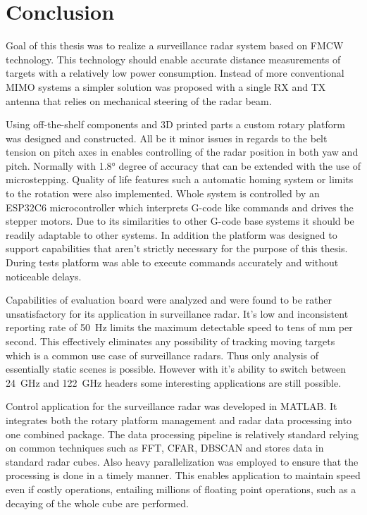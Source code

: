 \chapter*{Conclusion}

Goal of this thesis was to realize a surveillance radar system based on FMCW technology.
This technology should enable accurate distance measurements of targets with a relatively low power consumption.
Instead of more conventional MIMO systems a simpler solution was proposed with a single RX and TX antenna that relies on mechanical steering of the radar beam.

Using off-the-shelf components and 3D printed parts a custom rotary platform was designed and constructed.
All be it minor issues in regards to the belt tension on pitch axes in enables controlling of the radar position in both yaw and pitch.
Normally with 1.8° degree of accuracy that can be extended with the use of microstepping.
Quality of life features such a automatic homing system or limits to the rotation were also implemented.
Whole system is controlled by an ESP32C6 microcontroller which interprets G-code like commands and drives the stepper motors.
Due to its similarities to other G-code base systems it should be readily adaptable to other systems.
In addition the platform was designed to support capabilities that aren't strictly necessary for the purpose of this thesis.
During tests platform was able to execute commands accurately and without noticeable delays.

Capabilities of \sidar evaluation board were analyzed and were found to be rather unsatisfactory for its application in surveillance radar.
It's low and inconsistent reporting rate of 50~Hz limits the maximum detectable speed to tens of mm per second.
This effectively eliminates any possibility of tracking moving targets which is a common use case of surveillance radars.
Thus only analysis of essentially static scenes is possible.
However with it's ability to switch between 24~GHz and 122~GHz headers some interesting applications are still possible.

Control application for the surveillance radar was developed in MATLAB.
It integrates both the rotary platform management and radar data processing into one combined package.
The data processing pipeline is relatively standard relying on common techniques such as FFT, CFAR, DBSCAN and stores data in standard radar cubes.
Also heavy parallelization was employed to ensure that the processing is done in a timely manner.
This enables application to maintain speed even if costly operations, entailing millions of floating point operations, such as a decaying of the whole cube are performed.

